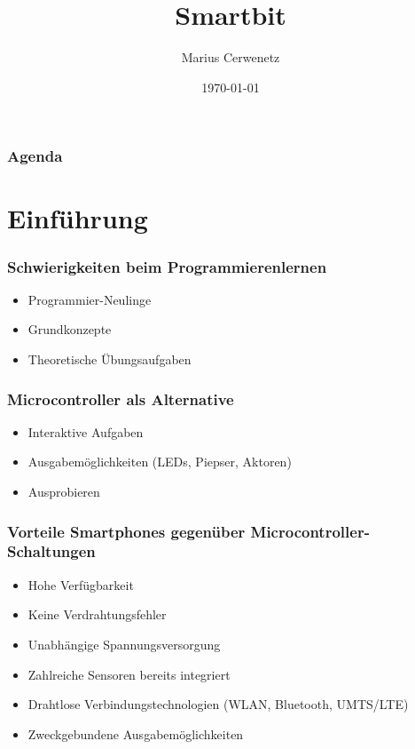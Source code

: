 \documentclass{beamer}
\title{Smartbit}
\author{Marius Cerwenetz}
\institute{Institut für Softwaretechnik und Datenkommunikation}
\date{\today}
\begin{document}
\frame{\titlepage}
\begin{frame}
\frametitle{Agenda}
\tableofcontents

\end{frame}

\section{Einführung}

\begin{frame}
    \frametitle{Schwierigkeiten beim Programmierenlernen}
    \begin{itemize}
        \item Programmier-Neulinge
        \item Grundkonzepte
        \item Theoretische Übungsaufgaben
    \end{itemize}
\end{frame}

\begin{frame}
    \frametitle{Microcontroller als Alternative}
    \begin{itemize}
        \item Interaktive Aufgaben
        \item Ausgabemöglichkeiten (LEDs, Piepser, Aktoren)
        \item Ausprobieren
    \end{itemize}
\end{frame}



\begin{frame}
    \frametitle{Vorteile Smartphones gegenüber Microcontroller-Schaltungen}
    \begin{itemize}
        \item Hohe Verfügbarkeit
        \item Keine Verdrahtungsfehler
        \item Unabhängige Spannungsversorgung
        \item Zahlreiche Sensoren bereits integriert
        \item Drahtlose Verbindungstechnologien (WLAN, Bluetooth, UMTS/LTE)
        \item Zweckgebundene Ausgabemöglichkeiten
    \end{itemize}
\end{frame}
\end{document}

